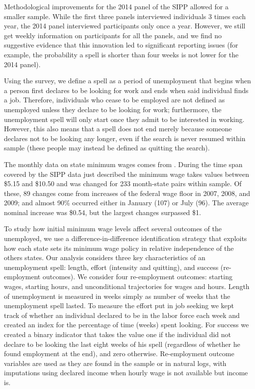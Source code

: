 \documentclass{article}
\begin{document}
Methodological improvements for the 2014 panel of the SIPP allowed for a smaller sample. While the first three panels interviewed individuals 3 times each year, the 2014 panel interviewed participants only once a year. However, we still get weekly information on participants for all the panels, and we find no suggestive evidence that this innovation led to significant reporting issues (for example, the probability a spell is shorter than four weeks is not lower for the 2014 panel).

Using the survey, we define a spell as a period of unemployment that begins when a person first declares to be looking for work and ends when said individual finds a job. Therefore, individuals who cease to be employed are not defined as unemployed unless they declare to be looking for work; furthermore, the unemployment spell will only start once they admit to be interested in working. However, this also means that a spell does not end merely because someone declares not to be looking any longer, even if the search is never resumed within sample (these people may instead be defined as quitting the search).

The monthly data on state minimum wages comes from \cite{vaghul2016historical}. During the time span covered by the SIPP data just described the minimum wage takes values between \$5.15 and \$10.50 and was changed for 233 month-state pairs within sample. Of these, 89 changes come from increases of the federal wage floor in 2007, 2008, and 2009; and almost 90\% occurred either in January (107) or July (96). The average nominal increase was \$0.54, but the largest changes surpassed \$1. 

To study how initial minimum wage levels affect several outcomes of the unemployed, we use a difference-in-difference identification strategy that exploits how each state sets its minimum wage policy in relative independence of the others states. Our analysis considers three key characteristics of an unemployment spell: length, effort (intensity and quitting), and success (re-employment outcomes). We consider four re-employment outcomes: starting wages, starting hours, and unconditional trajectories for wages and hours. Length of unemployment is measured in weeks simply as number of weeks that the unemployment spell lasted. To measure the effort put in job seeking we kept track of whether an individual declared to be in the labor force each week and created an index for the percentage of time (weeks) spent looking. For success we created a binary indicator that takes the value one if the individual did not declare to be looking the last eight weeks of his spell (regardless of whether he found employment at the end), and zero otherwise. Re-employment outcome variables are used as they are found in the sample or in natural logs, with imputations using declared income when hourly wage is not available but income is.
\end{document}
